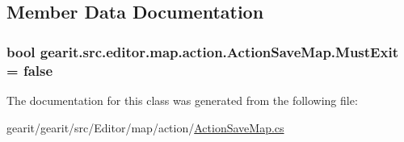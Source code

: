 \subsection{Member Data Documentation}
\hypertarget{classgearit_1_1src_1_1editor_1_1map_1_1action_1_1_action_save_map_a1021f2d682e8f98448394716e5ecb782}{
\subsubsection[{Must\+Exit}]{\setlength{\rightskip}{0pt plus 5cm}bool gearit.\+src.\+editor.\+map.\+action.\+Action\+Save\+Map.\+Must\+Exit = false\hspace{0.3cm}{\ttfamily [static]}}}\label{classgearit_1_1src_1_1editor_1_1map_1_1action_1_1_action_save_map_a1021f2d682e8f98448394716e5ecb782}


The documentation for this class was generated from the following file\+:\begin{DoxyCompactItemize}
\item 
gearit/gearit/src/\+Editor/map/action/\hyperlink{_action_save_map_8cs}{Action\+Save\+Map.\+cs}\end{DoxyCompactItemize}
